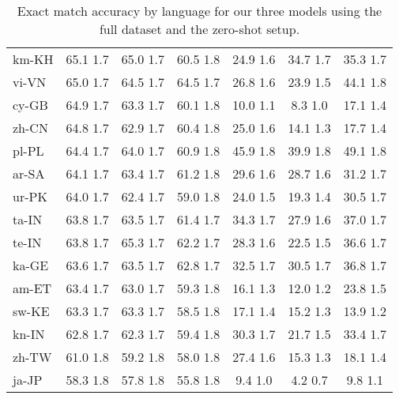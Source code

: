 \documentclass[11pt]{article}
\begin{document}
\begin{table*}[]
{\begin{tabular}{lcccccc}
km-KH & 65.1  1.7 & 65.0  1.7 & 60.5  1.8 & 24.9  1.6 & 34.7  1.7 & 35.3  1.7 \\
vi-VN & 65.0  1.7 & 64.5  1.7 & 64.5  1.7 & 26.8  1.6 & 23.9  1.5 & 44.1  1.8 \\
cy-GB & 64.9  1.7 & 63.3  1.7 & 60.1  1.8 & 10.0  1.1 & 8.3  1.0 & 17.1  1.4 \\
zh-CN & 64.8  1.7 & 62.9  1.7 & 60.4  1.8 & 25.0  1.6 & 14.1  1.3 & 17.7  1.4 \\
pl-PL & 64.4  1.7 & 64.0  1.7 & 60.9  1.8 & 45.9  1.8 & 39.9  1.8 & 49.1  1.8 \\
ar-SA & 64.1  1.7 & 63.4  1.7 & 61.2  1.8 & 29.6  1.6 & 28.7  1.6 & 31.2  1.7 \\
ur-PK & 64.0  1.7 & 62.4  1.7 & 59.0  1.8 & 24.0  1.5 & 19.3  1.4 & 30.5  1.7 \\
ta-IN & 63.8  1.7 & 63.5  1.7 & 61.4  1.7 & 34.3  1.7 & 27.9  1.6 & 37.0  1.7 \\
te-IN & 63.8  1.7 & 65.3  1.7 & 62.2  1.7 & 28.3  1.6 & 22.5  1.5 & 36.6  1.7 \\
ka-GE & 63.6  1.7 & 63.5  1.7 & 62.8  1.7 & 32.5  1.7 & 30.5  1.7 & 36.8  1.7 \\
am-ET & 63.4  1.7 & 63.0  1.7 & 59.3  1.8 & 16.1  1.3 & 12.0  1.2 & 23.8  1.5 \\
sw-KE & 63.3  1.7 & 63.3  1.7 & 58.5  1.8 & 17.1  1.4 & 15.2  1.3 & 13.9  1.2 \\
kn-IN & 62.8  1.7 & 62.3  1.7 & 59.4  1.8 & 30.3  1.7 & 21.7  1.5 & 33.4  1.7 \\
zh-TW & 61.0  1.8 & 59.2  1.8 & 58.0  1.8 & 27.4  1.6 & 15.3  1.3 & 18.1  1.4 \\
ja-JP & 58.3  1.8 & 57.8  1.8 & 55.8  1.8 & 9.4  1.0 & 4.2  0.7 & 9.8  1.1 \\
\bottomrule
\end{tabular}
}
\caption{Exact match accuracy by language for our three models using the full dataset and the zero-shot setup.}
\label{tab:all_ex_match}
\end{table*}
\end{document}

